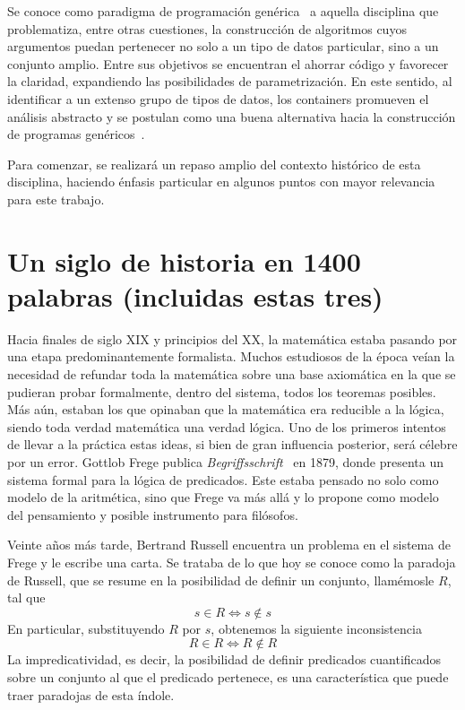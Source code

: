 Se conoce como paradigma de programación genérica~\cite{generic} a aquella disciplina que problematiza, entre otras cuestiones, la construcción de algoritmos cuyos argumentos puedan pertenecer no solo a un tipo de datos particular, sino a un conjunto amplio. Entre sus objetivos se encuentran el ahorrar código y favorecer la claridad, expandiendo las posibilidades de parametrización. En este sentido, al identificar a un extenso grupo de tipos de datos, los containers promueven el análisis abstracto y se postulan como una buena alternativa hacia la construcción de programas genéricos~\cite{alti:2007}.

Para comenzar, se realizará un repaso amplio del contexto histórico de esta disciplina, haciendo énfasis particular en algunos puntos con mayor relevancia para este trabajo.

\section*{Un siglo de historia en 1400 palabras (incluidas estas tres)}%

Hacia finales de siglo XIX y principios del XX, la matemática estaba pasando por una etapa predominantemente formalista. Muchos estudiosos de la época veían la necesidad de refundar toda la matemática sobre una base axiomática en la que se pudieran probar formalmente, dentro del sistema, todos los teoremas posibles. Más aún, estaban los que opinaban que la matemática era reducible a la lógica, siendo toda verdad matemática una verdad lógica. Uno de los primeros intentos de llevar a la práctica estas ideas, si bien de gran influencia posterior, será célebre por un error. Gottlob Frege publica {\it Begriffsschrift}~ en 1879, donde presenta un sistema formal para la lógica de predicados. Este estaba pensado no solo como modelo de la aritmética, sino que Frege va más allá y lo propone como modelo del pensamiento y posible instrumento para filósofos.

Veinte años más tarde, Bertrand Russell encuentra un problema en el sistema de Frege y le escribe una carta. Se trataba de lo que hoy se conoce como la paradoja de Russell, que se resume en la posibilidad de definir un conjunto, llamémosle $R$, tal que $$s \in R \Leftrightarrow s \notin s$$ En particular, substituyendo $R$ por $s$, obtenemos la siguiente inconsistencia $$R \in R \Leftrightarrow R \notin R$$
La impredicatividad, es decir, la posibilidad de definir predicados cuantificados sobre un conjunto al que el predicado pertenece, es una característica que puede traer paradojas de esta índole.

